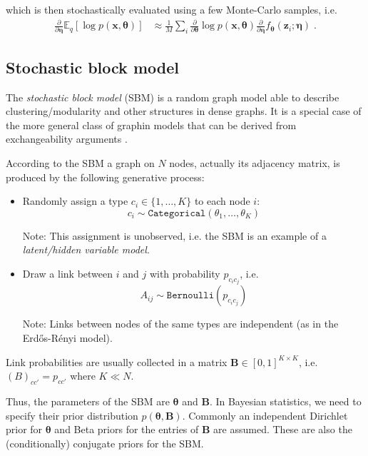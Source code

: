 \documentclass{article}
\renewcommand{\v}[1]{\bm{#1}}
\newcommand{\E}{\mathbb{E}}
\begin{document}
which is then stochastically evaluated using a few Monte-Carlo
samples, i.e.
\begin{equation}
\begin{split}
\frac{\partial}{\partial \v{\eta}} \E_q[ \log p(\v{x}, \v{\theta}) ]
&\approx \frac{1}{M} \sum_i \frac{\partial}{\partial \v{\theta}} \log p(\v{x}, \v{\theta})
\frac{\partial}{\partial \v{\eta}} f_{\v{\theta}}(\v{z}_i; \v{\eta}) \; .
\end{split}
\end{equation}

\subsection{Stochastic block model}

The {\em stochastic block model} (SBM) is a random graph model able to
describe clustering/modularity and other structures in dense
graphs. It is a special case of the more general class of graphin
models that can be derived from exchangeability arguments
\cite{OrbanzRoy}.

According to the SBM a graph on $N$ nodes, actually its adjacency
matrix, is produced by the following generative process:
\begin{itemize}
\item Randomly assign a type $c_i \in \{1,\ldots,K\}$ to each node
  $i$: \[ c_i \sim \mathtt{Categorical}(\theta_1,\ldots,\theta_K) \]
  
  Note: This assignment is unobserved, i.e. the SBM is an example of a
  {\em latent/hidden variable model}.
\item Draw a link between $i$ and $j$ with probability $p_{c_i
    c_j}$, i.e.
  \[ A_{ij} \sim \mathtt{Bernoulli}(p_{c_i c_j}) \]
  
  Note: Links between nodes of the same types are independent (as in
  the Erd\H{o}s-R{\'e}nyi model).
\end{itemize}

Link probabilities are usually collected in a matrix
$\v{B} \in [0,1]^{K \times K}$, i.e. $(B)_{c c'} = p_{c c'}$ where
$K \ll N$.

Thus, the parameters of the SBM are $\v{\theta}$ and $\v{B}$. In
Bayesian statistics, we need to specify their prior distribution
$p(\v{\theta}, \v{B})$. Commonly an independent Dirichlet prior for
$\v{\theta}$ and Beta priors for the entries of $\v{B}$ are
assumed. These are also the (conditionally) conjugate priors for the
SBM.
\end{document}
